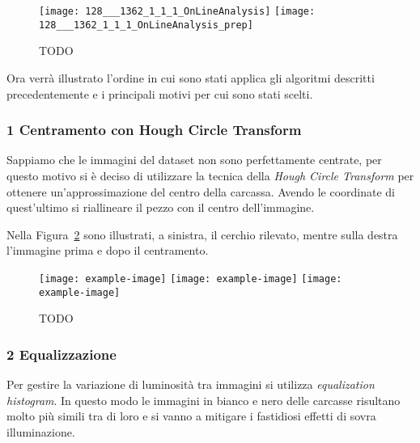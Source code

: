 \begin{figure}[ht] %
  \begin{center}
    \texttt{[image: 128\_\_\_1362\_1\_1\_1\_OnLineAnalysis]}
    \texttt{[image: 128\_\_\_1362\_1\_1\_1\_OnLineAnalysis\_prep]}
    \caption{TODO }
    \label{fig:prima_dopo_prep}
  \end{center}
\end{figure}

\clearpage
Ora verrà illustrato l'ordine in cui sono stati applica gli algoritmi descritti precedentemente e i principali motivi per cui sono stati scelti.

\subsubsection{1 Centramento con Hough Circle Transform}
Sappiamo che le immagini del dataset non sono perfettamente centrate, per questo motivo si è deciso di utilizzare la tecnica della \textit{Hough Circle Transform} per ottenere un'approssimazione del centro della carcassa.
Avendo le coordinate di quest'ultimo si riallineare il pezzo con il centro dell'immagine.

Nella Figura~\ref{fig:centramento} sono illustrati, a sinistra, il cerchio rilevato, mentre sulla destra l'immagine prima e dopo il centramento.
\begin{figure}[ht] %
  \begin{center}
    \texttt{[image: example-image]}
    \texttt{[image: example-image]}
    \texttt{[image: example-image]}
    \caption{TODO }
    \label{fig:centramento}
  \end{center}
\end{figure}

\subsubsection{2 Equalizzazione}
Per gestire la variazione di luminosità tra immagini si utilizza \textit{equalization histogram}.
In questo modo le immagini in bianco e nero delle carcasse risultano molto più simili tra di loro e si vanno a mitigare i fastidiosi effetti di sovra illuminazione.

